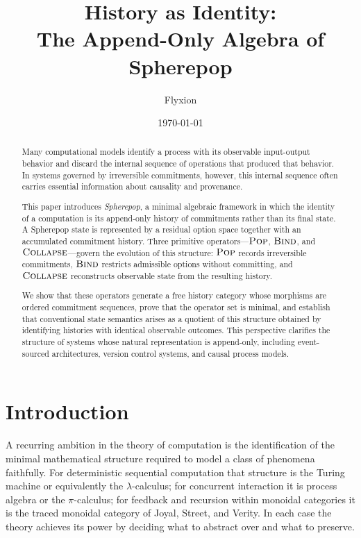 \documentclass[12pt]{article}
\title{History as Identity:\\
The Append-Only Algebra of Spherepop}
\author{Flyxion}
\date{\today}
\newcommand{\Pop}{\operatorname{\textsc{Pop}}}
\newcommand{\Bind}{\operatorname{\textsc{Bind}}}
\newcommand{\Collapse}{\operatorname{\textsc{Collapse}}}
\begin{document}
\maketitle

\begin{abstract}

Many computational models identify a process with its observable
input-output behavior and discard the internal sequence of
operations that produced that behavior. In systems governed by
irreversible commitments, however, this internal sequence often
carries essential information about causality and provenance.

This paper introduces \emph{Spherepop}, a minimal algebraic
framework in which the identity of a computation is its
append-only history of commitments rather than its final state.
A Spherepop state is represented by a residual option space
together with an accumulated commitment history. Three primitive
operators---$\Pop$, $\Bind$, and $\Collapse$---govern the
evolution of this structure: $\Pop$ records irreversible
commitments, $\Bind$ restricts admissible options without
committing, and $\Collapse$ reconstructs observable state from
the resulting history.

We show that these operators generate a free history category
whose morphisms are ordered commitment sequences, prove that the
operator set is minimal, and establish that conventional state
semantics arises as a quotient of this structure obtained by
identifying histories with identical observable outcomes.
This perspective clarifies the structure of systems whose natural
representation is append-only, including event-sourced
architectures, version control systems, and causal process models.

\end{abstract}

\newpage
\tableofcontents
\newpage

\section{Introduction}

A recurring ambition in the theory of computation is the identification of the minimal mathematical structure required to model a class of phenomena faithfully. For deterministic sequential computation that structure is the Turing machine or equivalently the $\lambda$-calculus; for concurrent interaction it is process algebra or the $\pi$-calculus; for feedback and recursion within monoidal categories it is the traced monoidal category of Joyal, Street, and Verity. In each case the theory achieves its power by deciding what to abstract over and what to preserve.
\end{document}
